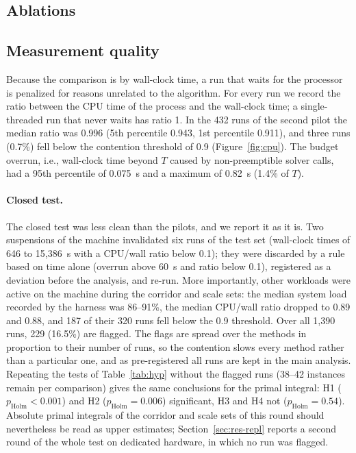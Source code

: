 \subsection{Ablations}

\subsection{Measurement quality}\label{sec:res-measure}
Because the comparison is by wall-clock time, a run that waits for the processor is penalized
for reasons unrelated to the algorithm. For every run we record the ratio between the CPU time
of the process and the wall-clock time; a single-threaded run that never waits has ratio 1. In
the 432 runs of the second pilot the median ratio was 0.996 (5th percentile 0.943, 1st percentile
0.911), and three runs (0.7\%) fell below the contention threshold of 0.9
(Figure~\ref{fig:cpu}). The budget overrun, i.e., wall-clock time beyond $T$ caused by
non-preemptible solver calls, had a 95th percentile of 0.075~s and a maximum of 0.82~s
(1.4\% of $T$).

\paragraph{Closed test.} The closed test was less clean than the pilots, and we report it as it
is. Two suspensions of the machine invalidated six runs of the test set (wall-clock times of 646
to 15{,}386~s with a CPU/wall ratio below 0.1); they were discarded by a rule based on time
alone (overrun above 60~s and ratio below 0.1), registered as a deviation before the analysis,
and re-run. More importantly, other workloads were active on the machine during the corridor and
scale sets: the median system load recorded by the harness was 86--91\%, the median CPU/wall
ratio dropped to 0.89 and 0.88, and 187 of their 320 runs fell below the 0.9 threshold. Over
all 1{,}390 runs, 229 (16.5\%) are flagged. The flags are spread over the methods in proportion
to their number of runs, so the contention slows every method rather than a particular one, and
as pre-registered all runs are kept in the main analysis. Repeating the tests of
Table~\ref{tab:hyp} without the flagged runs (38--42 instances remain per comparison) gives the
same conclusions for the primal integral: H1 ($p_{\mathrm{Holm}}<0.001$) and H2
($p_{\mathrm{Holm}}=0.006$) significant, H3 and H4 not ($p_{\mathrm{Holm}}=0.54$). Absolute
primal integrals of the corridor and scale sets of this round should nevertheless be read as
upper estimates; Section~\ref{sec:res-repl} reports a second round of the whole test on dedicated
hardware, in which no run was flagged.

